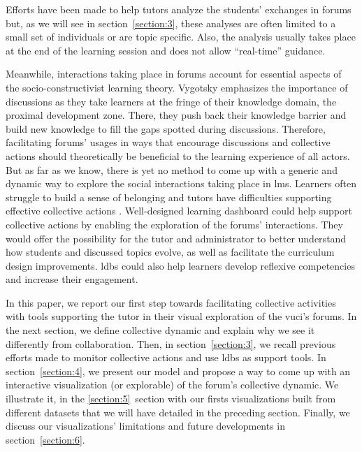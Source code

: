 \documentclass[a4paper,twoside]{article}
\begin{document}
Efforts have been made to help tutors analyze the students' exchanges in forums but, as we will see in section~\ref{section:3}, these analyses are often limited to a small set of individuals or are topic specific.  Also, the analysis usually takes place at the end of the learning session and does not allow ``real-time'' guidance.

Meanwhile, interactions taking place in forums account for essential aspects of the socio-constructivist learning theory.  Vygotsky emphasizes the importance of discussions as they take learners at the fringe of their knowledge domain, the proximal development zone.  There, they push back their knowledge barrier and build new knowledge to fill the gaps spotted during discussions.  Therefore, facilitating forums' usages in ways that encourage discussions and collective actions should theoretically be beneficial to the learning experience of all actors.  But as far as we know, there is yet no method to come up with a generic and dynamic way to explore the social interactions taking place in \gls{lms}.  Learners often struggle to build a sense of belonging \citep{Khalil2014} and tutors have difficulties supporting effective collective actions \citep{Zheng2015}.%
Well-designed learning dashboard could help support collective actions by enabling the exploration of the forums' interactions.  They would offer the possibility for the tutor and administrator to better understand how students and discussed topics evolve, as well as facilitate the curriculum design improvements.  \glspl{ldb} could also help learners develop reflexive competencies and increase their engagement.


In this paper, we report our first step towards facilitating collective activities with tools supporting the tutor in their visual exploration of the \gls{vuci}'s forums.
In the next section, we define collective dynamic and explain why we see it differently from collaboration.  Then, in section~\ref{section:3}, we recall previous efforts made to monitor collective actions and use \glspl{ldb} as support tools.  In section~\ref{section:4}, we present our model and propose a way to come up with an interactive visualization (or explorable) of the forum's collective dynamic.  We illustrate it, in the \ref{section:5}~section with our firsts visualizations built from different datasets that we will have detailed in the preceding section.  Finally, we discuss our visualizations' limitations and future developments in section~\ref{section:6}.
\end{document}

